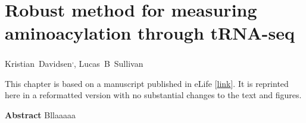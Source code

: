 \chapter{Robust method for measuring aminoacylation through tRNA-seq}
\label{chap5}

\renewcommand{\thefootnote}{\fnsymbol{footnote}}
\begin{center}
    \mbox{Kristian Davidsen\footnotemark[1]\textsuperscript{,}\footnotemark[2],}
    \mbox{Lucas B Sullivan\footnotemark[1]\footnotemark[5]}
\end{center}

\setcounter{footnote}{0}
\renewcommand{\thefootnote}{\arabic{footnote}}


\noindent This chapter is based on a manuscript published in eLife [\href{https://doi.org/10.7554/eLife.91554}{link}].
It is reprinted here in a reformatted version with no substantial changes to the text and figures.

\vspace{20pt}
\noindent \textbf{Abstract} \newline
\noindent Bllaaaaa
















